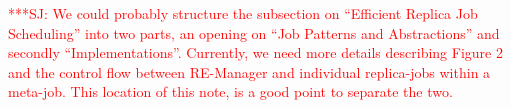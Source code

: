 \documentclass{rspublic}
\newcommand{\alnote}[1]{ {\textcolor{blue} { ***AL: #1 }}}
\newcommand{\jhanote}[1]{ {\textcolor{red} { ***SJ: #1 }}}
\newcommand{\alnote}[1]{}
\newcommand{\jhanote}[1]{}
\newcommand{\glidein}[1]{Glide-In }
\newcommand{\replicaagent}[1]{Replica-Agent }
\newcommand{\remanager}[1]{RE-Manager }
\begin{document}
\jhanote{We could probably structure the subsection on ``Efficient
  Replica Job Scheduling'' into two parts, an opening on ``Job
  Patterns and Abstractions'' and secondly
  ``Implementations''. Currently, we need more details describing
  Figure 2 and the control flow between \remanager\ and individual
  replica-jobs within a meta-job. This location of this note, is a
  good point to separate the two.}    



  
  
%  
%                                                           
% 
%            
\end{document}
